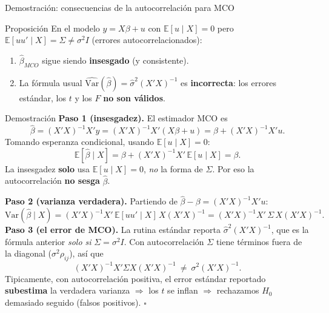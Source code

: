\documentclass{beamer}
\begin{document}
\begin{frame}[allowframebreaks]{Demostración: consecuencias de la autocorrelación para MCO}

\begin{alertblock}{Proposición}
En el modelo $y=X\beta+u$ con $\mathbb{E}[u\mid X]=0$ pero $\mathbb{E}[uu'\mid X]=\Sigma\neq\sigma^2 I$ (errores autocorrelacionados):
\begin{enumerate}
  \item $\hat\beta_{MCO}$ sigue siendo \textbf{insesgado} (y consistente).
  \item La fórmula usual $\widehat{\text{Var}}(\hat\beta)=\hat\sigma^2(X'X)^{-1}$ es \textbf{incorrecta}: los errores estándar, los $t$ y los $F$ \textbf{no son válidos}.
\end{enumerate}
\end{alertblock}

\begin{exampleblock}{Demostración}
\textbf{Paso 1 (insesgadez).} El estimador MCO es
\[
\hat\beta = (X'X)^{-1}X'y = (X'X)^{-1}X'(X\beta+u)=\beta+(X'X)^{-1}X'u.
\]
Tomando esperanza condicional, usando $\mathbb{E}[u\mid X]=0$:
\[
\mathbb{E}[\hat\beta\mid X]=\beta+(X'X)^{-1}X'\,\mathbb{E}[u\mid X]=\beta.
\]
La insesgadez \textbf{solo} usa $\mathbb{E}[u\mid X]=0$, \emph{no} la forma de $\Sigma$. Por eso la autocorrelación \textbf{no sesga} $\hat\beta$.

\framebreak

\textbf{Paso 2 (varianza verdadera).} Partiendo de $\hat\beta-\beta=(X'X)^{-1}X'u$:
\[
\text{Var}(\hat\beta\mid X)=(X'X)^{-1}X'\,\mathbb{E}[uu'\mid X]\,X(X'X)^{-1}=(X'X)^{-1}X'\,\Sigma\,X(X'X)^{-1}.
\]
\textbf{Paso 3 (el error de MCO).} La rutina estándar reporta $\hat\sigma^2(X'X)^{-1}$, que es la fórmula anterior \emph{solo si} $\Sigma=\sigma^2 I$. Con autocorrelación $\Sigma$ tiene términos fuera de la diagonal ($\sigma^2\rho_{ij}$), así que
\[
(X'X)^{-1}X'\Sigma X(X'X)^{-1}\ \neq\ \sigma^2(X'X)^{-1}.
\]
Tipicamente, con autocorrelación positiva, el error estándar reportado \textbf{subestima} la verdadera varianza $\Rightarrow$ los $t$ se inflan $\Rightarrow$ rechazamos $H_0$ demasiado seguido (falsos positivos). \hfill $\square$
\end{exampleblock}

\end{frame}
\end{document}
